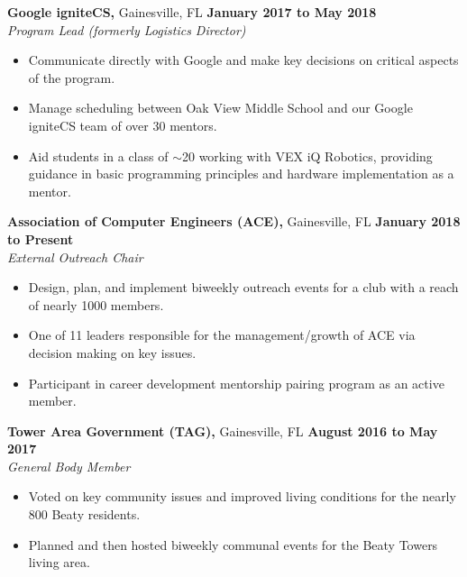 \documentclass[11pt]{article} %
\begin{document}
		\vspace{.1cm}
		
		\noindent \textbf{Google igniteCS,} Gainesville, FL \hfill\textbf{January 2017 to May 2018}\\
		\textit{Program Lead (formerly Logistics Director)}
		\begin{itemize}[noitemsep,nolistsep, label = {-}]
			\item Communicate directly with Google and make key decisions on critical aspects of the program.
			\item Manage scheduling between Oak View Middle School and our Google igniteCS team of over 30 mentors.
			\item Aid students in a class of $\sim$20 working with VEX iQ Robotics, providing guidance in basic programming principles and hardware implementation as a mentor.
		\end{itemize} 
	
		\vspace{.1cm}
		
		\noindent \textbf{Association of Computer Engineers (ACE),} Gainesville, FL \hfill\textbf{January 2018 to Present}\\
		\textit{External Outreach Chair}
		\begin{itemize}[noitemsep,nolistsep, label={-}]
			\item Design, plan, and implement biweekly outreach events for a club with a reach of nearly 1000 members.
			\item One of 11 leaders responsible for the management/growth of ACE via decision making on key issues.
			\item Participant in career development mentorship pairing program as an active member.
		\end{itemize}
	
		\vspace{.1cm}
		
		\noindent \textbf{Tower Area Government (TAG),} Gainesville, FL \hfill\textbf{August 2016 to May 2017}\\
		\textit{General Body Member}
		\begin{itemize}[noitemsep,nolistsep, label={-}]
			\item Voted on key community issues and improved living conditions for the nearly 800 Beaty residents.
			\item Planned and then hosted biweekly communal events for the Beaty Towers living area.
		\end{itemize}
	
\end{document}
